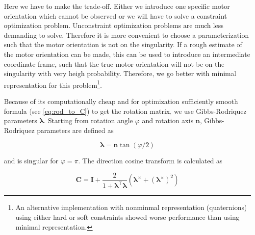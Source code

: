 Here we have to make the trade-off. Either we introduce one specific motor orientation which cannot be observed or we will have to solve a constraint optimization problem.
Unconstraint optimization problems are much less demanding to solve.
Therefore it is more convenient to choose a parameterization such that the motor orientation is not on the singularity.
If a rough estimate of the motor orientation can be made, this can be used to introduce an intermediate coordinate frame, such that the true motor orientation will not be on the singularity with very heigh probability.
Therefore, we go better with minimal representation for this problem\footnote{
An alternative implementation with nonminmal representation (quaternions) using either hard or soft constraints showed worse performance than using minimal representation.
}.

Because of its computationally cheap and for optimization sufficiently smooth formula (see \cref{eq:rod_to_C}) to get the rotation matrix, we use Gibbs-Rodriquez parameters $\boldsymbol{\lambda}$. Starting from rotation angle $\varphi$ and rotation axis $\mathbf{n}$, Gibbs-Rodriquez parameters are defined as

\begin{equation}
\boldsymbol{\lambda} = \mathbf{n} \tan(\varphi/2) 
\end{equation}

and is singular for $\varphi = \pi$. The direction cosine transform is calculated as

\begin{equation}
\label{eq:rod_to_C}
\mathbf{C} = \mathbf{I} + \frac{2}{1+\boldsymbol{\lambda}^\top \boldsymbol{\lambda}}
\left(\boldsymbol{\lambda}^\times + \left(\boldsymbol{\lambda}^\times\right)^2\right)
\end{equation}

